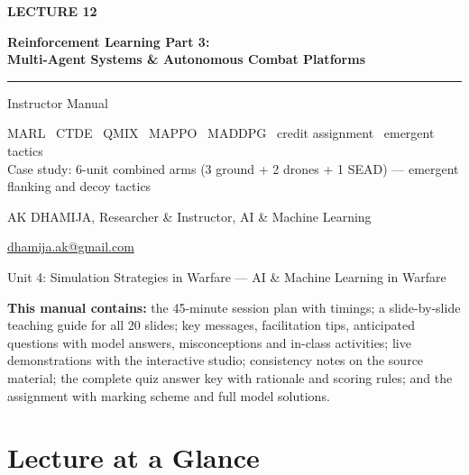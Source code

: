 \documentclass[11pt]{article}
\begin{document}
\begin{titlepage}\centering\vspace*{2.2cm}
{\color{AccN}\large\bfseries LECTURE 12\par}\vspace{0.6cm}
{\color{NavyN}\Huge\bfseries Reinforcement Learning Part 3:\\Multi-Agent Systems \& Autonomous Combat Platforms\par}\vspace{0.6cm}
{\color{AccN}\rule{0.7\textwidth}{1.5pt}}\par\vspace{0.6cm}
{\LARGE Instructor Manual\par}\vspace{0.4cm}
{\large\begin{minipage}{0.85\textwidth}\centering MARL \textbullet\ CTDE \textbullet\ QMIX \textbullet\ MAPPO \textbullet\ MADDPG \textbullet\ credit assignment \textbullet\ emergent tactics\\Case study: 6-unit combined arms (3 ground + 2 drones + 1 SEAD) --- emergent flanking and decoy tactics\end{minipage}\par}\vspace{2cm}
{\large AK DHAMIJA, Researcher \& Instructor, AI \& Machine Learning\par}\vspace{0.2cm}
{\normalsize \href{mailto:dhamija.ak@gmail.com}{dhamija.ak@gmail.com} \quad\textbullet{}\par}\vspace{0.3cm}
{Unit 4: Simulation Strategies in Warfare --- AI \& Machine Learning in Warfare\par}\vfill
\begin{tcolorbox}[colback=NavyN!4,colframe=NavyN,boxrule=0.6pt,arc=2pt,width=0.9\textwidth]\small
\textbf{This manual contains:} the 45-minute session plan with timings; a slide-by-slide teaching guide for all 20 slides; key messages, facilitation tips, anticipated questions with model answers, misconceptions and in-class activities; live demonstrations with the interactive studio; consistency notes on the source material; the complete quiz answer key with rationale and scoring rules; and the assignment with marking scheme and full model solutions.
\end{tcolorbox}
\end{titlepage}
\tableofcontents\newpage


\section{Lecture at a Glance}
\end{document}
